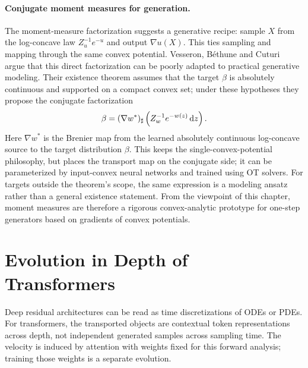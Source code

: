 \paragraph{Conjugate moment measures for generation.}
The moment-measure factorization suggests a generative recipe: sample $X$ from the log-concave law $Z_u^{-1}e^{-u}$ and output $\nabla u(X)$. This ties sampling and mapping through the same convex potential. Vesseron, B\'ethune and Cuturi~\cite{VesseronBethuneCuturi2025ConjugateMomentMeasures} argue that this direct factorization can be poorly adapted to practical generative modeling. Their existence theorem assumes that the target \(\beta\) is absolutely continuous and supported on a compact convex set; under these hypotheses they propose the conjugate factorization
\begin{equation}\label{eq-conjugate-moment-measure}
	\beta
	=
	(\nabla w^*)_\sharp
	\left(Z_w^{-1}e^{-w(z)}\,\mathrm{d} z\right).
\end{equation}
Here $\nabla w^*$ is the Brenier map from the learned absolutely continuous log-concave source to the target distribution $\beta$. This keeps the single-convex-potential philosophy, but places the transport map on the conjugate side; it can be parameterized by input-convex neural networks and trained using OT solvers. For targets outside the theorem's scope, the same expression is a modeling ansatz rather than a general existence statement. From the viewpoint of this chapter, moment measures are therefore a rigorous convex-analytic prototype for one-step generators based on gradients of convex potentials.

\section{Evolution in Depth of Transformers}
\label{sec-transformer-depth-evolution}

Deep residual architectures can be read as time discretizations of ODEs or PDEs. For transformers, the transported objects are contextual token representations across depth, not independent generated samples across sampling time. The velocity is induced by attention with weights fixed for this forward analysis; training those weights is a separate evolution.

